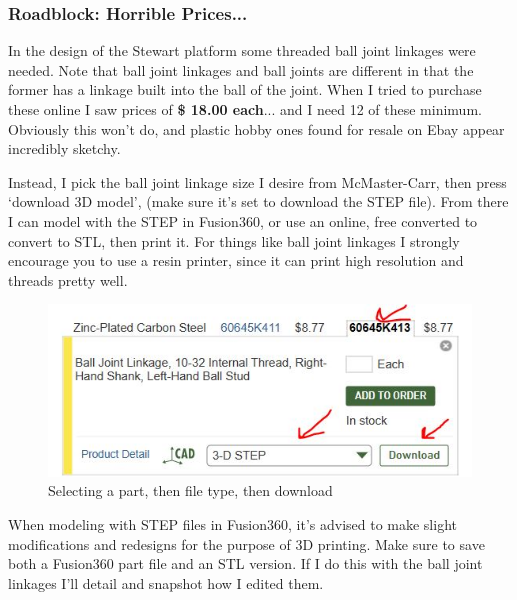 \documentclass[a4paper, 10pt]{article}
\begin{document}
		\subsubsection{Roadblock: Horrible Prices...}
		In the design of the Stewart platform some threaded ball joint linkages were needed. Note that ball joint linkages and ball joints are different in that the former has a linkage built into the ball of the joint. When I tried to purchase these online I saw prices of \textbf{\$ 18.00 each}... and I need 12 of these minimum. Obviously this won't do, and plastic hobby ones found for resale on Ebay appear incredibly sketchy.
		
		Instead, I pick the ball joint linkage size I desire from McMaster-Carr, then press `download 3D model', (make sure it's set to download the STEP file). From there I can model with the STEP in Fusion360, or use an online, free converted to convert to STL, then print it. For things like ball joint linkages I strongly encourage you to use a resin printer, since it can print high resolution and threads pretty well.
		
		\begin{figure} [h]
			\centering
			\includegraphics[scale=0.75]{mcmaster_models}
			\caption{Selecting a part, then file type, then download}
			\label{getting_models}
		\end{figure}
		
		When modeling with STEP files in Fusion360, it's advised to make slight modifications and redesigns for the purpose of 3D printing. Make sure to save both a Fusion360 part file and an STL version. If I do this with the ball joint linkages I'll detail and snapshot how I edited them.
\end{document}
